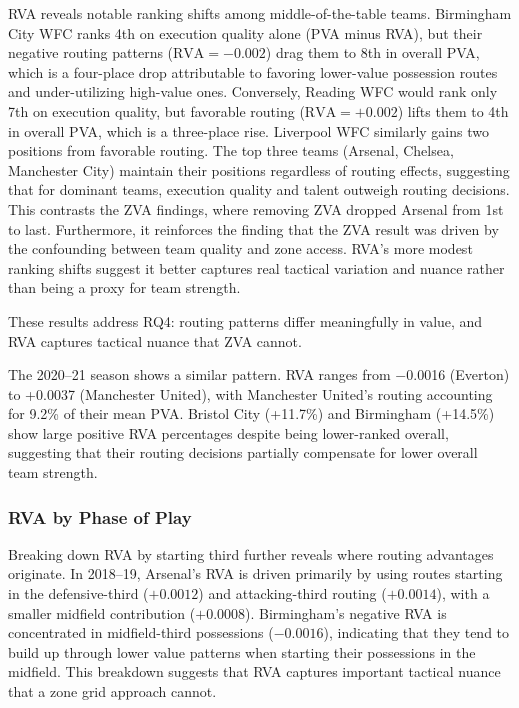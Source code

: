 \documentclass[12pt,a4paper]{article}
\begin{document}
RVA reveals notable ranking shifts among middle-of-the-table teams. Birmingham City WFC ranks 4th on execution quality alone (PVA minus RVA), but their negative routing patterns ($\text{RVA} = -0.002$) drag them to 8th in overall PVA, which is a four-place drop attributable to favoring lower-value possession routes and under-utilizing high-value ones. Conversely, Reading WFC would rank only 7th on execution quality, but favorable routing ($\text{RVA} = +0.002$) lifts them to 4th in overall PVA, which is a three-place rise. Liverpool WFC similarly gains two positions from favorable routing. The top three teams (Arsenal, Chelsea, Manchester City) maintain their positions regardless of routing effects, suggesting that for dominant teams, execution quality and talent outweigh routing decisions. This contrasts the ZVA findings, where removing ZVA dropped Arsenal from 1st to last. Furthermore, it reinforces the finding that the ZVA result was driven by the confounding between team quality and zone access. RVA's more modest ranking shifts suggest it better captures real tactical variation and nuance rather than being a proxy for team strength. 

These results address RQ4: routing patterns differ meaningfully in value, and RVA captures tactical nuance that ZVA cannot.

The 2020--21 season shows a similar pattern. RVA ranges from $-$0.0016 (Everton) to +0.0037 (Manchester United), with Manchester United's routing accounting for 9.2\% of their mean PVA. Bristol City (+11.7\%) and Birmingham (+14.5\%) show large positive RVA percentages despite being lower-ranked overall, suggesting that their routing decisions partially compensate for lower overall team strength.

\subsubsection{RVA by Phase of Play}

Breaking down RVA by starting third further reveals where routing advantages originate. In 2018--19, Arsenal's RVA is driven primarily by using routes starting in the defensive-third ($+0.0012$) and attacking-third routing ($+0.0014$), with a smaller midfield contribution ($+0.0008$). Birmingham's negative RVA is concentrated in midfield-third possessions ($-0.0016$), indicating that they tend to build up through lower value patterns when starting their possessions in the midfield. This breakdown suggests that RVA captures important tactical nuance that a zone grid approach cannot.
\end{document}
